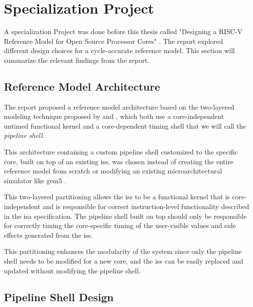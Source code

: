 \chapter{Specialization Project}
\label{ch:specialization}
\label{sec:specialization}

A specialization Project was done before this thesis called "Designing a RISC-V Reference Model for Open Source Processor Cores" \cite{torjenygaardeikenesDesigningRISCVReference2023}. The report explored different design choices for a cycle-accurate reference model. This section will summarize the relevant findings from the report.




\section{Reference Model Architecture}
\label{sec:pw_architecture}

The report proposed a reference model architecture based on the two-layered modeling technique proposed by \textcite{chiangEfficientTwolayeredCycleaccurate2009} and \textcite{leeFaCSimFastCycleAccurate2008}, which both use a core-independent untimed functional kernel and a core\--dependent timing shell that we will call the \textit{pipeline shell}.

This architecture containing a custom pipeline shell customized to the specific core, built on top of an existing \acrshort{iss}, was chosen instead of creating the entire reference model from scratch or modifying an existing microarchitectural simulator like gem5 \cite{Gem5Simulator2023}. 

This two-layered partitioning allows the \acrshort{iss} to be a functional kernel that is core-independent and is responsible for correct instruction-level functionality described in the \acrshort{isa} specification. The pipeline shell built on top should only be responsible for correctly timing the core-specific timing of the user-visible values and side effects generated from the \acrshort{iss}. 

This partitioning enhances the modularity of the system since only the pipeline shell needs to be modified for a new core, and the \acrshort{iss} can be easily replaced and updated without modifying the pipeline shell. 


\section{Pipeline Shell Design}
\label{sec:pw_pipelineShellDesign}

